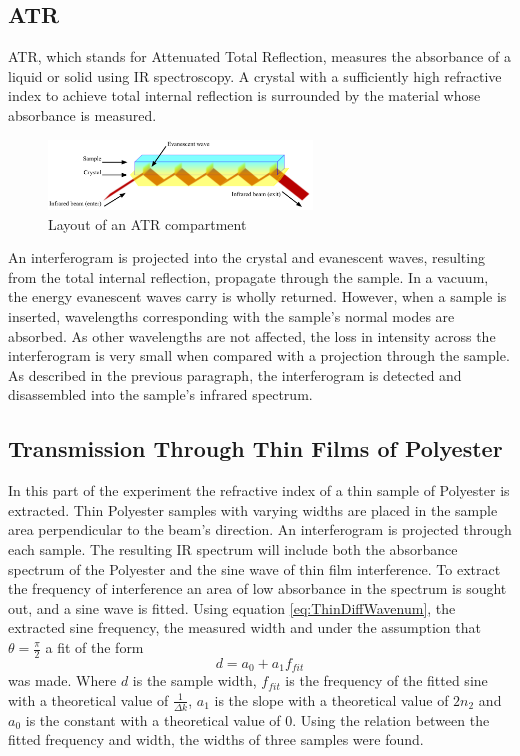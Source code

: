 \documentclass[reprint,amsmath,amssymb,aps, prl]{revtex4-2}
\begin{document}
\subsection{ATR}
ATR, which stands for Attenuated Total Reflection, measures the absorbance of a liquid or solid using IR spectroscopy. A crystal with a sufficiently high refractive index to achieve total internal reflection is surrounded by the material whose absorbance is measured. 
\begin{figure}[h]
    \includegraphics[width=7cm]{Images/ATR.png}
    \caption{Layout of an ATR compartment \cite{wiki:ATR}}
    \label{fig:ATR}
    \centering
\end{figure}
An interferogram is projected into the crystal and evanescent waves, resulting from the total internal reflection, propagate through the sample. In a vacuum, the energy evanescent waves carry is wholly returned. However, when a sample is inserted, wavelengths corresponding with the sample's normal modes are absorbed. As other wavelengths are not affected, the loss in intensity across the interferogram is very small when compared with a projection through the sample. As described in the previous paragraph, the interferogram is detected and disassembled into the sample's infrared spectrum.

\subsection{Transmission Through Thin Films of Polyester}
In this part of the experiment the refractive index of a thin sample of Polyester is extracted. Thin Polyester samples with varying widths are placed in the sample area perpendicular to the beam's direction. An interferogram is projected through each sample. The resulting IR spectrum will include both the absorbance spectrum of the Polyester and the sine wave of thin film interference. To extract the frequency of interference an area of low absorbance in the spectrum is sought out, and a sine wave is fitted.  Using equation \ref{eq:ThinDiffWavenum}, the extracted sine frequency, the measured width and under the assumption that $\theta =\frac{\pi}{2}$ a fit of the form
\begin{equation}
    \label{eq:ThinLinFit}
    d=a_{0}+a_{1}f_{fit}
\end{equation}
was made. Where $d$ is the sample width, $f_{fit}$ is the frequency of the fitted sine with a theoretical value of $\frac{1}{\Delta k}$, $a_{1}$ is the slope with a theoretical value of $2n_{2}$ and $a_{0}$ is the constant with a theoretical value of 0. Using the relation between the fitted frequency and width, the widths of three samples were found.
\end{document}
